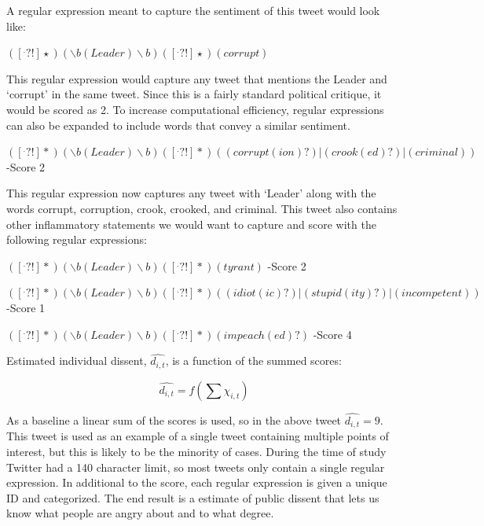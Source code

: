 \documentclass[12pt]{article}
\begin{document}
\begin{spacing}{1.5}
\noindent A regular expression meant to capture the sentiment of this tweet would look like:

\begin{center}
$([^.?!]\star)(\backslash b(Leader)\backslash b)([^.?!]\star)(corrupt)$
\end{center}

\noindent This regular expression would capture any tweet that mentions the Leader and `corrupt' in the same tweet. Since this is a fairly standard political critique, it would be scored as 2. To increase computational efficiency, regular expressions can also be expanded to include words that convey a similar sentiment.

\begin{center}
$([^.?!]*) (\backslash b(Leader)\backslash b)([^.?!]*)((corrupt(ion)?)|(crook(ed)?)|(criminal))$ -Score 2
\end{center}

\noindent This regular expression now captures any tweet with `Leader' along with the words corrupt, corruption, crook, crooked, and criminal. This tweet also contains other inflammatory statements we would want to capture and score with the following regular expressions:  

\vspace{.5 em}

\begin{center}
$([^.?!]*)(\backslash b(Leader)\backslash b)([^.?!]*)(tyrant)$ -Score 2

\vspace{.5 em}
$([^.?!]*) (\backslash b(Leader)\backslash b)([^.?!]*)((idiot(ic)?)|(stupid(ity)?)|(incompetent))$ -Score 1

\vspace{.5 em}
$([^.?!]*)(\backslash b(Leader)\backslash b)([^.?!]*)(impeach(ed)?)$ -Score 4
\end{center}

\noindent Estimated individual dissent, $\hat{d_{i,t}}$, is a function of the summed scores:

\vspace{.5 em}
\begin{equation}
\hat{d_{i,t}}= f(\sum \chi_{i,t})
\end{equation}

As a baseline a linear sum of the scores is used, so in the above tweet $\hat{d_{i,t}}=9$. This tweet is used as an example of a single tweet containing multiple points of interest, but this is likely to be the minority of cases. During the time of study Twitter had a 140 character limit, so most tweets only contain a single regular expression. In additional to the score, each regular expression is given a unique ID and categorized. The end result is a estimate of public dissent that lets us know what people are angry about and to what degree. 



\end{spacing}
\end{document}
